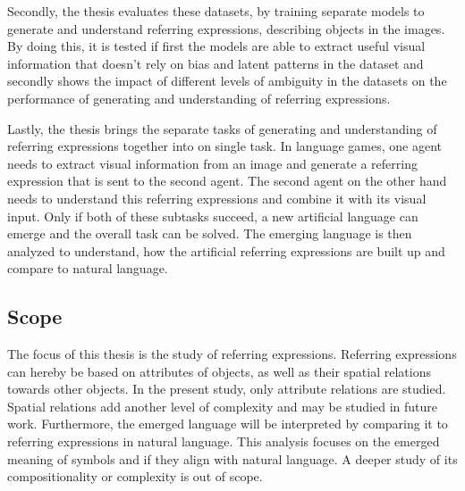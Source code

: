 Secondly, the thesis evaluates these datasets, by training separate models to generate and understand referring expressions, describing objects in the images.
By doing this, it is tested if first the models are able to extract useful visual information that doesn't rely on bias and latent patterns in the dataset and secondly shows the impact of different levels of ambiguity in the datasets on the performance of generating and understanding of referring expressions.

Lastly, the thesis brings the separate tasks of generating and understanding of referring expressions together into on single task.
In language games, one agent needs to extract visual information from an image and generate a referring expression that is sent to the second agent.
The second agent on the other hand needs to understand this referring expressions and combine it with its visual input.
Only if both of these subtasks succeed, a new artificial language can emerge and the overall task can be solved.
The emerging language is then analyzed to understand, how the artificial referring expressions are built up and compare to natural language.

\subsection{Scope}
The focus of this thesis is the study of referring expressions.
Referring expressions can hereby be based on attributes of objects, as well as their spatial relations towards other objects.
In the present study, only attribute relations are studied.
Spatial relations add another level of complexity and may be studied in future work.
Furthermore, the emerged language will be interpreted by comparing it to referring expressions in natural language.
This analysis focuses on the emerged meaning of symbols and if they align with natural language.
A deeper study of its compositionality or complexity is out of scope.
